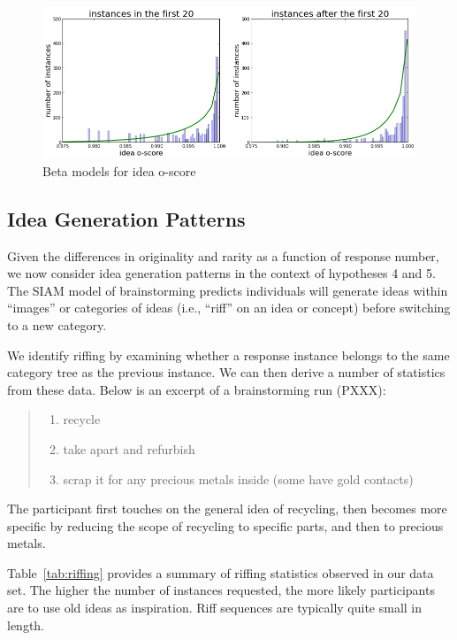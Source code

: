 \begin{figure}[h]
    \centering
    \includegraphics[width=0.9\columnwidth]{hyp4_ideas}
    \caption{Beta models for idea o-score}
    \label{fig:idea_oscore_hyp4}
\end{figure}






\subsection{Idea Generation Patterns}
Given the differences in originality and rarity as a function of response number, we now consider idea generation patterns in the context of hypotheses 4 and 5. The SIAM model of brainstorming predicts individuals will generate ideas within ``images'' or categories of ideas (i.e., ``riff'' on an idea or concept) before switching to a new category.

We identify riffing by examining whether a response instance belongs to the same category tree as the previous instance. We can then derive a number of statistics from these data. Below is an excerpt of a brainstorming run (PXXX):

\begin{quote}
    \begin{enumerate}
        \item recycle
        \item take apart and refurbish
        \item scrap it for any precious metals inside (some have gold contacts)
    \end{enumerate}
\end{quote}

The participant first touches on the general idea of recycling, then becomes more specific by reducing the scope of recycling to specific parts, and then to precious metals.

Table~\ref{tab:riffing} provides a summary of riffing statistics observed in our data set. The higher the number of instances requested, the more likely participants are to use old ideas as inspiration. Riff sequences are typically quite small in length.

